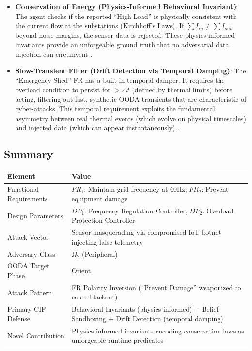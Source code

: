 \documentclass[
]{article}
\newcounter{none} %
\providecommand{\tightlist}{%
  \setlength{\itemsep}{0pt}\setlength{\parskip}{0pt}}
\begin{document}
\begin{itemize}
\tightlist
\item
  \textbf{Conservation of Energy (Physics-Informed Behavioral
  Invariant)}: The agent checks if the reported ``High Load'' is
  physically consistent with the current flow at the substations
  (Kirchhoff's Laws). If \(\sum I_{in} \neq \sum I_{out}\) beyond noise
  margins, the sensor data is rejected. These physics-informed
  invariants provide an unforgeable ground truth that no adversarial
  data injection can circumvent
  \cite{raissi2019physics, friedman2026cogsec3}.
\item
  \textbf{Slow-Transient Filter (Drift Detection via Temporal Damping)}:
  The ``Emergency Shed'' FR has a built-in temporal damper. It requires
  the overload condition to persist for \(> \Delta t\) (defined by
  thermal limits) before acting, filtering out fast, synthetic OODA
  transients that are characteristic of cyber-attacks. This temporal
  requirement exploits the fundamental asymmetry between real thermal
  events (which evolve on physical timescales) and injected data (which
  can appear instantaneously) \cite{liang2017review}.
\end{itemize}

\subsection{Summary}\label{summary-8}

{\def\LTcaptype{none} %
\begin{longtable}[]{@{}
  >{\raggedright\arraybackslash}p{}
  >{\raggedright\arraybackslash}p{}@{}}
\toprule\noalign{}
\begin{minipage}[b]{\linewidth}\raggedright
Element
\end{minipage} & \begin{minipage}[b]{\linewidth}\raggedright
Value
\end{minipage} \\
\midrule\noalign{}
\endhead
\bottomrule\noalign{}
\endlastfoot
Functional Requirements & \(FR_1\): Maintain grid frequency at 60Hz;
\(FR_2\): Prevent equipment damage \\
Design Parameters & \(DP_1\): Frequency Regulation Controller; \(DP_2\):
Overload Protection Controller \\
Attack Vector & Sensor masquerading via compromised IoT botnet injecting
false telemetry \\
Adversary Class & \(\Omega_2\) (Peripheral) \\
OODA Target Phase & Orient \\
Attack Pattern & FR Polarity Inversion (``Prevent Damage'' weaponized to
cause blackout) \\
Primary CIF Defense & Behavioral Invariants (physics-informed) + Belief
Sandboxing + Drift Detection (temporal damping) \\
Novel Contribution & Physics-informed invariants encoding conservation
laws as unforgeable runtime predicates \\
\end{longtable}
}
\end{document}
